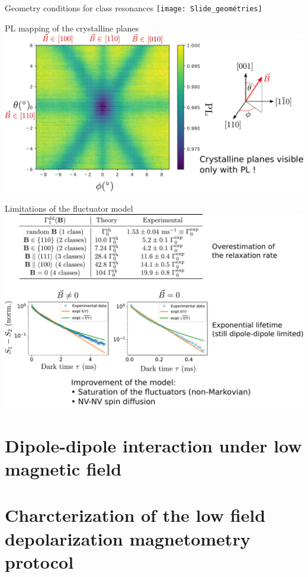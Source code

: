 \documentclass{beamer}
\begin{document}
\begin{frame}{Geometry conditions for class resonances}
\centering
\texttt{[image: Slide\_geométries]}
\end{frame}

\begin{frame}{PL mapping of the crystalline planes}
\centering
\includegraphics[width=\textwidth,height=0.8\textheight,keepaspectratio]{Slide_carte}
\end{frame}

\begin{frame}{Limitations of the fluctuator model}
\centering
\includegraphics[width=\textwidth,height=0.9\textheight,keepaspectratio]{Slide_limit_fluct}
\end{frame}

\section{Dipole-dipole interaction under low magnetic field}



\section{Charcterization of the low field depolarization magnetometry protocol}
\end{document}
